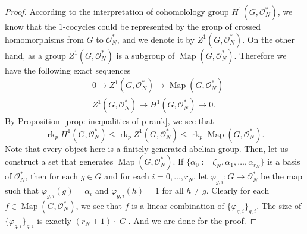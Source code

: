 \documentclass{amsart}
\numberwithin{equation}{section}
\theoremstyle{plain}
\theoremstyle{definition}
\theoremstyle{remark}
\begin{document}
\begin{proof}
	According to the interpretation of cohomolology group $H^1(G,\mathscr{O}_N^*)$, we know that the $1$-cocycles could be represented by the group of crossed homomorphisms from $G$ to $\mathscr{O}_N^*$, and we denote it by $Z^1(G,\mathscr{O}_N^*)$.
	On the other hand, as a group $Z^1(G,\mathscr{O}_N^*)$ is a subgroup of $\operatorname{Map}(G,\mathscr{O}_N^*)$.
	Therefore we have the following exact sequences
	\begin{equation*}
		\begin{aligned}
			&0\to Z^1(G,\mathscr{O}_N^*)\to\operatorname{Map}(G,\mathscr{O}_N^*)\\
			&Z^1(G,\mathscr{O}_N^*)\to H^1(G,\mathscr{O}_N^*)\to0.
		\end{aligned}
	\end{equation*}
	By Proposition~\ref{prop: inequalities of p-rank}, we see that 
	\begin{equation*}
		\operatorname{rk}_pH^1(G,\mathscr{O}_N^*)\leq\operatorname{rk}_pZ^1(G,\mathscr{O}_N^*)\leq\operatorname{rk}_p\operatorname{Map}(G,\mathscr{O}_N^*).
	\end{equation*}
	Note that every object here is a finitely generated abelian group.
	Then, let us construct a set that generates $\operatorname{Map}(G,\mathscr{O}_N^*)$.
	If $\{\alpha_0:=\zeta_N,\alpha_1,\dots,\alpha_{r_N}\}$ is a basis of $\mathscr{O}_N^*$, then for each $g\in G$ and for each $i=0,\dots,r_N$, let $\varphi_{g,i}:G\to\mathscr{O}_N^*$ be the map such that $\varphi_{g,i}(g)=\alpha_i$ and $\varphi_{g,i}(h)=1$ for all $h\neq g$.
	Clearly for each $f\in\operatorname{Map}(G,\mathscr{O}_N^*)$, we see that $f$ is a linear combination of $\{\varphi_{g,i}\}_{g,i}$.
	The size of $\{\varphi_{g,i}\}_{g,i}$ is exactly $(r_N+1)\cdot\lvert G\rvert$.
	And we are done for the proof.
\end{proof}
\end{document}
